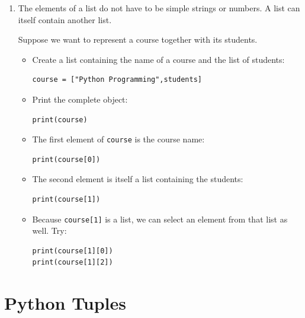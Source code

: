\documentclass{article}
\begin{document}
\begin{enumerate}

\item The elements of a list do not have to be simple strings or numbers.  A list can itself contain another list.

Suppose we want to represent a course together with its students.

\begin{itemize}

\item Create a list containing the name of a course and the list of students:

\begin{verbatim}
course = ["Python Programming",students]
\end{verbatim}

\item Print the complete object:

\begin{verbatim}
print(course)
\end{verbatim}

\item The first element of \texttt{course} is the course name:

\begin{verbatim}
print(course[0])
\end{verbatim}

\item The second element is itself a list containing the students:

\begin{verbatim}
print(course[1])
\end{verbatim}
\vspace{0.25cm}

\item Because \texttt{course[1]} is a list, we can select an element from that list as well.  Try:

\begin{verbatim}
print(course[1][0])
print(course[1][2])
\end{verbatim}

\end{itemize}
\end{enumerate}


\section{Python Tuples}
\end{document}
